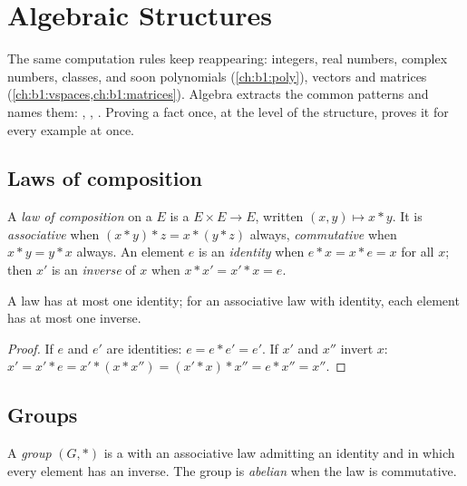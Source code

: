 \chapter{Algebraic Structures}\label{ch:b1:structures}

The same computation rules keep reappearing: integers, real numbers,
complex numbers,  classes, and soon polynomials
(\cref{ch:b1:poly}), vectors and matrices
(\cref{ch:b1:vspaces,ch:b1:matrices}). Algebra extracts the common
patterns and names them: \emph{}, \emph{}, \emph{}.
Proving a fact once, at the level of the structure, proves it for
every example at once.

\section{Laws of composition}

\begin{definition}\label{def:b1:structures:law}
A \emph{law of composition} on a  $E$ is
a  $E \times E \to E$, written $(x, y) \mapsto x * y$. It is
\emph{associative} when $(x*y)*z = x*(y*z)$ always, \emph{commutative}
when $x * y = y * x$ always. An element $e$ is an \emph{identity} when
$e * x = x * e = x$ for all $x$; then $x'$ is an \emph{inverse} of $x$
when $x * x' = x' * x = e$.
\end{definition}

\begin{proposition}[Uniqueness]\label{prop:b1:structures:unique}
A law has at most one identity; for an associative law with identity,
each element has at most one inverse.
\end{proposition}

\begin{proof}
If $e$ and $e'$ are identities: $e = e * e' = e'$. If $x'$ and $x''$
invert $x$: $x' = x' * e = x' * (x * x'') = (x' * x) * x'' = e * x''
= x''$.
\end{proof}

\section{Groups}

\begin{definition}[Group]\label{def:b1:structures:group}
A \emph{group} $(G, *)$ is a  with an associative law
admitting an identity and in which every element has an inverse. The
group is \emph{abelian} when the law is
commutative.
\end{definition}

